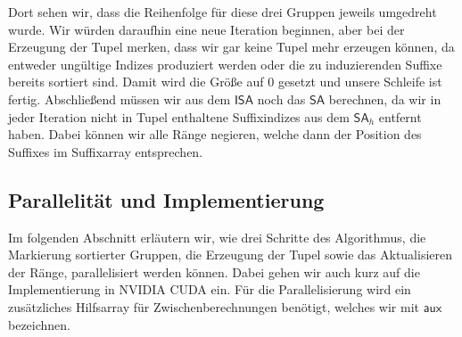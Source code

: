 Dort sehen wir, dass die Reihenfolge für diese drei Gruppen jeweils umgedreht wurde. Wir würden daraufhin eine neue Iteration beginnen, aber bei der Erzeugung der Tupel merken, dass wir gar keine Tupel mehr erzeugen können, da entweder ungültige Indizes produziert werden oder die zu induzierenden Suffixe bereits sortiert sind. Damit wird die Größe auf 0 gesetzt und unsere Schleife ist fertig. Abschließend müssen wir aus dem $\mathsf{ISA}$ noch das $\mathsf{SA}$ berechnen, da wir in jeder Iteration nicht in Tupel enthaltene Suffixindizes aus dem $\mathsf{SA}_h$ entfernt haben. Dabei können wir alle Ränge negieren, welche dann der Position des Suffixes im Suffixarray entsprechen.


\subsection{Parallelität und Implementierung}
Im folgenden Abschnitt erläutern wir, wie drei Schritte des Algorithmus, die Markierung sortierter Gruppen, die Erzeugung der Tupel sowie das Aktualisieren der Ränge, parallelisiert werden können. Dabei gehen wir auch kurz auf die Implementierung in NVIDIA CUDA ein.
Für die Parallelisierung wird ein zusätzliches Hilfsarray für Zwischenberechnungen benötigt, welches wir mit $\mathsf{aux}$ bezeichnen.

